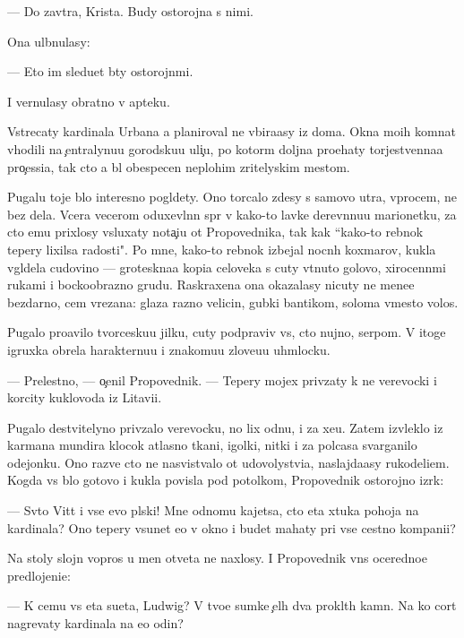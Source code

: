 \documentclass[10pt]{book}
\begin{document}
— Do zavtra, Krista. Budy ostorojna s nimi.

Ona ul{\yi}bnulasy:

— Eto im sledu{\y}et b{\yi}ty ostorojn{\yi}mi.

I vernulasy obratno v apteku.

Vstrecaty kardinala Urbana {\y}a planiroval ne v{\yi}bira{\y}asy iz doma. Okna mo{\y}ih komnat v{\yi}hodili na {\c}entralynu{\y}u gorodsku{\y}u uli{\c}u, po kotor{\yi}m doljna pro{\y}ehaty torjestvenna{\y}a pro{\c}essi{\y}a, tak cto {\y}a b{\yi}l obespecen neplohim zritelyskim mestom.

Pugalu toje b{\yi}lo interesno pogl{\ia}dety. Ono torcalo zdesy s samovo utra, vprocem, ne bez dela. Vcera vecerom oduxevl{\e}nn{\yi}{\y} sp{\e}r v kako{\y}-to lavke derev{\ia}nnu{\y}u marionetku, za cto {\y}emu prixlosy v{\yi}sluxaty nota{\c}i{\y}u ot Propovednika, tak kak ``kako{\y}-to reb{\e}nok tepery lixilsa radosti". Po mne, kako{\y}-to reb{\e}nok izbejal nocn{\yi}h koxmarov, kukla v{\yi}gl{\ia}dela cudovi{\x}no — groteskna{\y}a kopi{\y}a celoveka s cuty v{\yi}t{\ia}nuto{\y} golovo{\y}, xirocenn{\yi}mi rukami i bockoobrazno{\y} grud{\y}u. Raskraxena ona okazalasy nicuty ne mene{\y}e bezdarno, cem v{\yi}rezana: glaza razno{\y} velicin{\yi}, gubki bantikom, soloma vmesto volos.

Pugalo pro{\y}avilo tvorcesku{\y}u jilku, cuty podpraviv vs{\e}, cto nujno, serpom. V itoge igruxka obrela harakternu{\y}u i znakomu{\y}u zlove{\x}u{\y}u uhm{\yi}locku.

— Prelestno, — o{\c}enil Propovednik. — Tepery mojex priv{\ia}zaty k ne{\y} verevocki i korcity kuklovoda iz Litavi{\y}i.

Pugalo de{\y}stvitelyno priv{\ia}zalo verevocku, no lix odnu, i za xe{\y}u. Zatem izvleklo iz karmana mundira klocok atlasno{\y} tkani, igolki, nitki i za polcasa svarganilo odejonku. Ono razve cto ne nasvist{\yi}valo ot udovolystvi{\y}a, naslajda{\y}asy rukodeli{\y}em. Kogda vs{\e} b{\yi}lo gotovo i kukla povisla pod potolkom, Propovednik ostorojno izr{\e}k:

— Sv{\ia}to{\y} Vitt i vse {\y}evo pl{\ia}ski! Mne odnomu kajetsa, cto eta xtuka pohoja na kardinala? Ono tepery v{\yi}sunet {\y}e{\y}o v okno i budet mahaty pri vse{\y} cestno{\y} kompani{\y}i?

Na stoly slojn{\yi}{\y} vopros u men{\ia} otveta ne naxlosy. I Propovednik vn{\e}s oceredno{\y}e predlojeni{\y}e:

— K cemu vs{\ia} eta su{\y}eta, Ludwig? V tvo{\y}e{\y} sumke {\c}el{\yi}h dva prokl{\ia}t{\yi}h kamn{\ia}. Na ko{\y} cort nagrevaty kardinala na {\y}e{\x}o odin?
\end{document}
